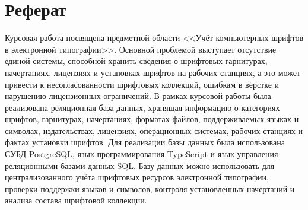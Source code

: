 \section*{Реферат}

Курсовая работа посвящена предметной области <<Учёт компьютерных шрифтов в электронной типографии>>. Основной проблемой выступает отсутствие единой системы, способной хранить сведения о шрифтовых гарнитурах, начертаниях, лицензиях и установках шрифтов на рабочих станциях, а это может привести к несогласованности шрифтовых коллекций, ошибкам в вёрстке и нарушению лицензионных ограничений. В рамках курсовой работы была реализована реляционная база данных, хранящая информацию о категориях шрифтов, гарнитурах, начертаниях, форматах файлов, поддерживаемых языках и символах, издательствах, лицензиях, операционных системах, рабочих станциях и фактах установки шрифтов. Для реализации базы данных была использована СУБД PostgreSQL, язык программирования TypeScript и язык управления реляционными базами данных SQL. Базу данных можно использовать для централизованного учёта шрифтовых ресурсов электронной типографии, проверки поддержки языков и символов, контроля установленных начертаний и анализа состава шрифтовой коллекции.

\newpage
